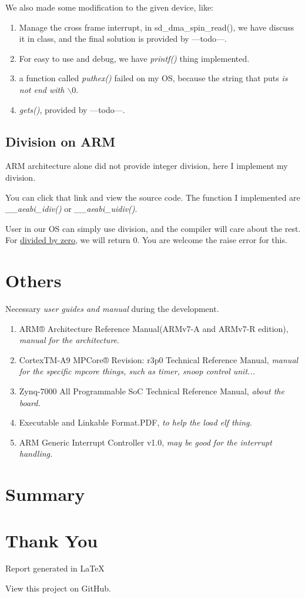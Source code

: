 \documentclass{article}
\begin{document}
We also made some modification to the given device, like:

\begin{enumerate}
	\item	Manage the cross frame interrupt, in sd\_dma\_spin\_read(), we have discuss it in class, and the final solution is provided by ---todo---.
	\item	For easy to use and debug, we have \emph{printf()} thing implemented.
	\item a function called \emph{puthex()} failed on my OS, because the string that puts \emph{is not end with $\backslash 0$}.
	\item \emph{gets()}, provided by ---todo---.
\end{enumerate}

\subsection{Division on ARM}

ARM architecture alone did not provide integer division, here I implement my division.\cite{---todo---}

You can click that link and view the source code. The function I implemented are \emph{\_\_aeabi\_idiv()} or \emph{\_\_aeabi\_uidiv()}.

User in our OS can simply use division, and the compiler will care about the rest. For \underline{divided by zero}, we will return 0. You are welcome the raise error for this.

\section{Others}

Necessary \emph{user guides and manual} during the development.

\begin{enumerate}
	\item	ARM® Architecture Reference Manual(ARMv7-A and ARMv7-R edition), \emph{manual for the architecture}.
	\item CortexTM-A9 MPCore® Revision: r3p0 Technical Reference Manual, \emph{manual for the specific mpcore things, such as timer, snoop control unit...}
	\item	Zynq-7000 All Programmable SoC Technical Reference Manual, \emph{about the board.}
	\item	Executable and Linkable Format.PDF, \emph{to help the load elf thing.}
	\item ARM Generic Interrupt Controller v1.0, \emph{may be good for the interrupt handling.}
\end{enumerate}

\section{Summary}

\section{Thank You}

\indent \indent Report generated in \LaTeX

View this project on GitHub.

\begin{thebibliography}{99}
\end{thebibliography}
\end{document}
